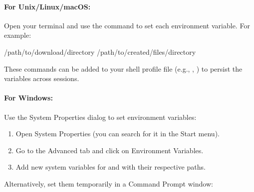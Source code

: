 \documentclass[letterpaper,10pt,english]{sphinxmanual}
\begin{document}
\begin{fulllineitems}
\paragraph{For Unix/Linux/macOS:}
\label{\detokenize{cleanup:for-unix-linux-macos}}
\sphinxAtStartPar
Open your terminal and use the  command to set each environment variable. For example:

\begin{sphinxVerbatim}[commandchars=\\\{\}]
/path/to/download/directory
/path/to/created/files/directory
\end{sphinxVerbatim}

\sphinxAtStartPar
These commands can be added to your shell profile file (e.g., , ) to persist the variables across sessions.


\paragraph{For Windows:}
\label{\detokenize{cleanup:for-windows}}
\sphinxAtStartPar
Use the System Properties dialog to set environment variables:
\begin{enumerate}
%
\item {} 
\sphinxAtStartPar
Open System Properties (you can search for it in the Start menu).

\item {} 
\sphinxAtStartPar
Go to the Advanced tab and click on Environment Variables.

\item {} 
\sphinxAtStartPar
Add new system variables for  and  with their respective paths.

\end{enumerate}

\sphinxAtStartPar
Alternatively, set them temporarily in a Command Prompt window:

\begin{sphinxVerbatim}[commandchars=\\\{\}]
\end{sphinxVerbatim}



\end{fulllineitems}
\end{document}
